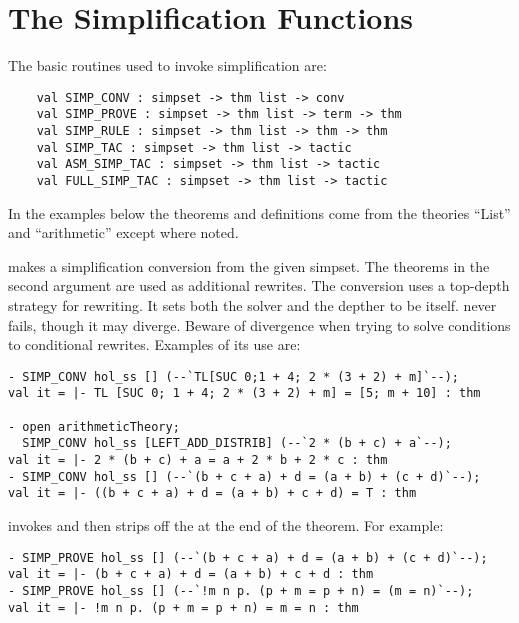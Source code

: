 \documentclass[a4]{article}
\begin{document}
\section{The Simplification Functions}

The basic routines used to invoke simplification are:
\begin{boxed} \begin{verbatim}
    val SIMP_CONV : simpset -> thm list -> conv
    val SIMP_PROVE : simpset -> thm list -> term -> thm
    val SIMP_RULE : simpset -> thm list -> thm -> thm
    val SIMP_TAC : simpset -> thm list -> tactic
    val ASM_SIMP_TAC : simpset -> thm list -> tactic
    val FULL_SIMP_TAC : simpset -> thm list -> tactic
\end{verbatim} \end{boxed}

In the examples below the theorems and definitions come from the
theories ``List'' and ``arithmetic'' except where noted.

 makes a simplification conversion from the given
simpset.  The theorems in the second argument are used as additional
rewrites. The conversion uses a top-depth strategy for rewriting. It
sets both the solver and the depther to be  itself.
 never fails, though it may diverge.  Beware of
divergence when trying to solve conditions to conditional rewrites.
Examples of its use are:
\begin{verbatim}
- SIMP_CONV hol_ss [] (--`TL[SUC 0;1 + 4; 2 * (3 + 2) + m]`--);
val it = |- TL [SUC 0; 1 + 4; 2 * (3 + 2) + m] = [5; m + 10] : thm

- open arithmeticTheory;
  SIMP_CONV hol_ss [LEFT_ADD_DISTRIB] (--`2 * (b + c) + a`--);
val it = |- 2 * (b + c) + a = a + 2 * b + 2 * c : thm
- SIMP_CONV hol_ss [] (--`(b + c + a) + d = (a + b) + (c + d)`--);
val it = |- ((b + c + a) + d = (a + b) + c + d) = T : thm
\end{verbatim}

 invokes  and then strips off the
 at the end of the theorem. For example:
\begin{verbatim}
- SIMP_PROVE hol_ss [] (--`(b + c + a) + d = (a + b) + (c + d)`--);
val it = |- (b + c + a) + d = (a + b) + c + d : thm
- SIMP_PROVE hol_ss [] (--`!m n p. (p + m = p + n) = (m = n)`--);
val it = |- !m n p. (p + m = p + n) = m = n : thm
\end{verbatim}
\end{document}
